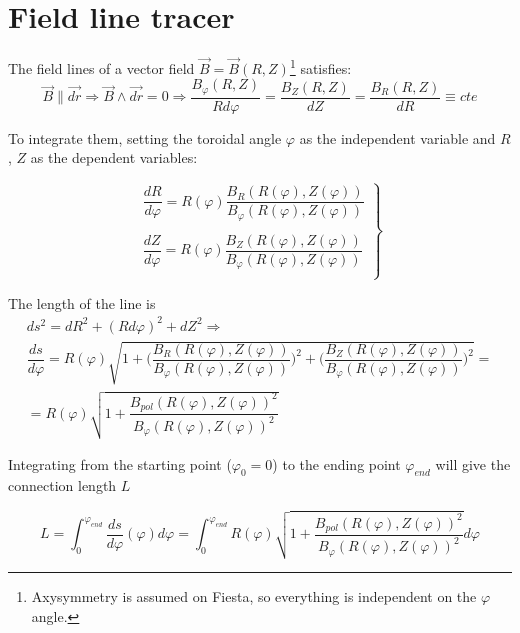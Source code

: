 \documentclass[a4paper,12pt,oneside]{book}
\begin{document}
\section{Field line tracer}

The field lines of a vector field $\vec{B}=\vec{B}(R,Z)$\footnote{Axysymmetry is assumed on Fiesta, so everything is independent on the $\varphi$ angle.} satisfies:
\begin{equation}
\vec{B} \parallel \vec{dr} \Rightarrow\vec{B} \wedge \vec{dr}=0 \Rightarrow \dfrac{B_{\varphi}(R,Z)}{R d\varphi}= \dfrac{B_Z(R,Z)}{dZ}=\dfrac{B_R(R,Z)}{dR} \equiv cte
\end{equation}

 To integrate them, setting the toroidal angle $\varphi$ as the independent variable and $R$, $Z$ as the dependent variables:

\begin{equation}\label{ec R,Z int}
\left. \begin{array}{c} 
\dfrac{dR}{d\varphi}=R(\varphi) \dfrac{B_R(R(\varphi),Z(\varphi))}{B_\varphi(R(\varphi),Z(\varphi))} \\ 
\\
\dfrac{dZ}{d\varphi}=R(\varphi) \dfrac{B_Z(R(\varphi),Z(\varphi))}{B_\varphi(R(\varphi),Z(\varphi))}  \\
\end{array} \right\}
\end{equation}

The length of the line is 
\begin{equation}\label{ec ds/dphi int}
\left.
\begin{array}{c}
ds^2=dR^2+(Rd\varphi)^2+dZ^2 \Rightarrow \\ \dfrac{ds}{d \varphi}=R(\varphi) \sqrt{1+ \Big( \dfrac{B_R(R(\varphi),Z(\varphi))}{B_\varphi(R(\varphi),Z(\varphi))} \Big)^2+ \Big( \dfrac{B_Z(R(\varphi),Z(\varphi))}{B_\varphi(R(\varphi),Z(\varphi))} \Big)^2}= \\ =R(\varphi) \sqrt{1+\dfrac{B_{pol}(R(\varphi),Z(\varphi))^2}{B_\varphi(R(\varphi),Z(\varphi))^2}}
\end{array}
\right.
\end{equation}

Integrating from the starting point ($\varphi_0=0$) to the ending point $\varphi_{end}$ will give the connection length $L$

\begin{equation}
L=\displaystyle \int_{0}^{\varphi_{end}} \dfrac{ds}{d \varphi} (\varphi) d \varphi = \displaystyle \int_{0}^{{\varphi_{end}}} R(\varphi) \sqrt{1+\dfrac{B_{pol}(R(\varphi),Z(\varphi))^2}{B_\varphi(R(\varphi),Z(\varphi))^2}} d \varphi
\end{equation}
\end{document}
